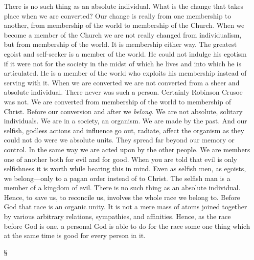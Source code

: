 \documentclass[12pt,a5paper,twoside,titlepage]{book}
\begin{document}
There is no such thing as an absolute individual. 
What is the change that takes place 
when we are converted? Our change is really 
from one membership to another, from membership 
of the world to membership of the Church. 
When we become a member of the Church we are 
not really changed from individualism, but from 
membership of the world. It is membership 
either way. The greatest egoist and self-seeker 
is a member of the world. He could not indulge 
his egotism if it were not for the society in the 
midst of which he lives and into which he is 
articulated. He is a member of the world who 
exploits his membership instead of serving with 
it. When we are converted we are not converted 
from a sheer and absolute individual. 
There never was such a person. Certainly 
Robinson Crusoe was not. We are converted 
from membership of the world to membership 
of Christ. Before our conversion and after 
we \textit{belong}. We are not absolute, solitary individuals. 
We are in a society, an organism. 
We are made by the past. And our selfish, 
godless actions and influence go out, radiate, 
affect the organism as they could not do were 
we absolute units. They spread far beyond our 
memory or control. In the same way we are 
acted upon by the other people. We are members 
one of another both for evil and for good. 
When you are told that evil is only selfishness it 
is worth while bearing this in mind. Even as selfish 
men, as egoists, we belong---only to a pagan 
order instead of to Christ. The selfish man is a 
member of a kingdom of evil. There is no such 
thing as an absolute individual. Hence, to save 
us, to reconcile us, involves the whole race we 
belong to. Before God that race is an organic 
unity. It is not a mere mass of atoms joined 
together by various arbitrary relations, sympathies, 
and affinities. Hence, as the race before 
God is one, a personal God is able to do for the 
race some one thing which at the same time is 
good for every person in it. 

\begin{center}
\S
\end{center}
\end{document}
